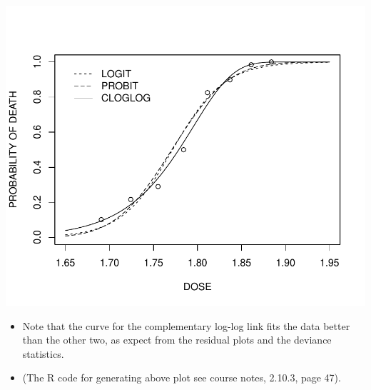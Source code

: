\documentclass{article}\usepackage[]{graphicx}\usepackage[svgnames]{xcolor}
\makeatletter
\def\maxwidth{ %
  \ifdim\Gin@nat@width>\linewidth
    \linewidth
  \else
    \Gin@nat@width
  \fi
}
\newenvironment{knitrout}{}{} %
\makeatother
\begin{document}
\begin{knitrout}
{\centering \includegraphics[width=\maxwidth]{figure/unnamed-chunk-48-1} 

}


\end{knitrout}
\begin{itemize}
      \item Note that the curve for the complementary log-log link fits the data better than
            the other two, as expect from the residual plots and the deviance statistics.
      \item (The R code for generating above plot see course notes, 2.10.3, page 47).
\end{itemize}
\end{document}
